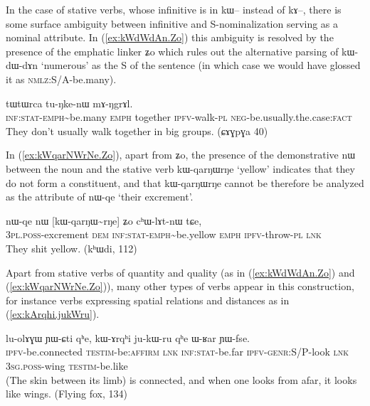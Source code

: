 \documentclass[oldfontcommands,oneside,a4paper,11pt]{article}
\newcommand{\ipa}[1]{{\phon \mbox{#1}}} %
\newcommand{\refb}[1]{(\ref{#1})}
\begin{document}
  In the case of stative verbs, whose infinitive is in \ipa{kɯ--} instead of \ipa{kɤ--}, there is some surface ambiguity between infinitive and S-nominalization serving as a nominal attribute. In \refb{ex:kWdWdAn.Zo}  this ambiguity is resolved by the presence of the emphatic linker \ipa{ʑo} which rules out the alternative parsing of \ipa{kɯ-dɯ-dɤn} `numerous' as the S of the sentence (in which case we would have glossed it as \textsc{nmlz}:S/A-be.many).
  
\begin{exe}
\ex \label{ex:kWdWdAn.Zo}
\gll
[\ipa{kɯ-dɯ\textasciitilde{}dɤn}] 	\ipa{ʑo} 	\ipa{tɯtɯrca} 	\ipa{tu-ŋke-nɯ} 	\ipa{mɤ-ŋgrɤl.} \\
\textsc{inf:stat-emph}\textasciitilde{}be.many \textsc{emph} together \textsc{ipfv}-walk-\textsc{pl} \textsc{neg}-be.usually.the.case:\textsc{fact} \\
\glt They don't usually walk together in big groups. (\ipa{ɕɤɣpɣa} 40)
\end{exe}

In \refb{ex:kWqarNWrNe.Zo}, apart from \ipa{ʑo}, the presence of the demonstrative   \ipa{nɯ} between the noun  and the stative verb 	\ipa{kɯ-qarŋɯrŋe} `yellow' indicates that  they do not form a constituent, and that 	\ipa{kɯ-qarŋɯrŋe} cannot be therefore be analyzed as the attribute of  \ipa{nɯ-qe} `their excrement'.

\begin{exe}
\ex \label{ex:kWqarNWrNe.Zo}
\gll
\ipa{nɯ-qe} 	\ipa{nɯ} 	[\ipa{kɯ-qarŋɯ\textasciitilde{}rŋe}] 	\ipa{ʑo} 	\ipa{cʰɯ-lɤt-nɯ} 	\ipa{tɕe,} \\
\textsc{3pl.poss}-excrement \textsc{dem} \textsc{inf:stat-emph}\textasciitilde{}be.yellow \textsc{emph}  \textsc{ipfv}-throw-\textsc{pl} \textsc{lnk} \\
\glt They shit yellow. (\ipa{kʰɯdi}, 112)
\end{exe}


Apart from stative  verbs of quantity and quality   (as in \refb{ex:kWdWdAn.Zo} and \refb{ex:kWqarNWrNe.Zo}), many other types of verbs appear in this construction, for instance verbs expressing spatial relations and distances as in \refb{ex:kArqhi.jukWru}.

\begin{exe}
\ex \label{ex:kArqhi.jukWru}
\gll
\ipa{lu-olɤɣɯ} 	\ipa{ɲɯ-ɕti} 	\ipa{qʰe,} 	\ipa{kɯ-ɤrqʰi} 	\ipa{ju-kɯ-ru} 	\ipa{qʰe} 	\ipa{ɯ-ʁar} 	\ipa{ɲɯ-fse.}\\
\textsc{ipfv}-be.connected \textsc{testim}-be:\textsc{affirm} \textsc{lnk} \textsc{inf:stat}-be.far \textsc{ipfv-genr}:S/P-look \textsc{lnk} \textsc{3sg.poss}-wing \textsc{testim}-be.like\\
\glt (The skin between its limb) is connected, and when one looks from afar, it looks like wings. (Flying fox, 134)
\end{exe}
\end{document}
